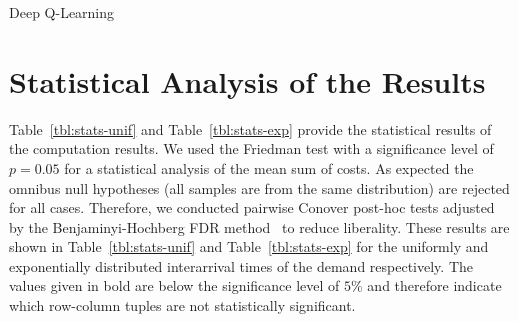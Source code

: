 \documentclass[envcountsame]{llncs}
\begin{document}
\begin{algorithm}[h!]
\begin{algorithmic}[1]
\begin{minipage}[t]{\dimexpr\textwidth-\leftmargin-\labelsep-\labelwidth-\leftmargin+2pt}
    \end{minipage}
    \EndIf
    \EndFor{}
    \EndFor{}
    \EndIf{}
    \EndWhile{}
  \end{algorithmic}
  \caption{\label{alg:ql}Deep Q-Learning}
\end{algorithm}


\section{Statistical Analysis of the Results}

Table~\ref{tbl:stats-unif} and Table~\ref{tbl:stats-exp} provide the statistical results of the
computation results. We used the Friedman test with a significance level of \(p=0.05\) for a
statistical analysis of the mean sum of costs. As expected the omnibus null hypotheses (all samples
are from the same distribution) are rejected for all cases. Therefore, we conducted pairwise Conover
post-hoc tests adjusted by the Benjaminyi-Hochberg FDR method~\citep{benjamini1995controlling} to
reduce liberality. These results are shown in Table~\ref{tbl:stats-unif} and
Table~\ref{tbl:stats-exp} for the uniformly and exponentially distributed interarrival times of the
demand respectively. The values given in bold are below the significance level of \(5\%\) and
therefore indicate which row-column tuples are not statistically significant.
\end{document}
